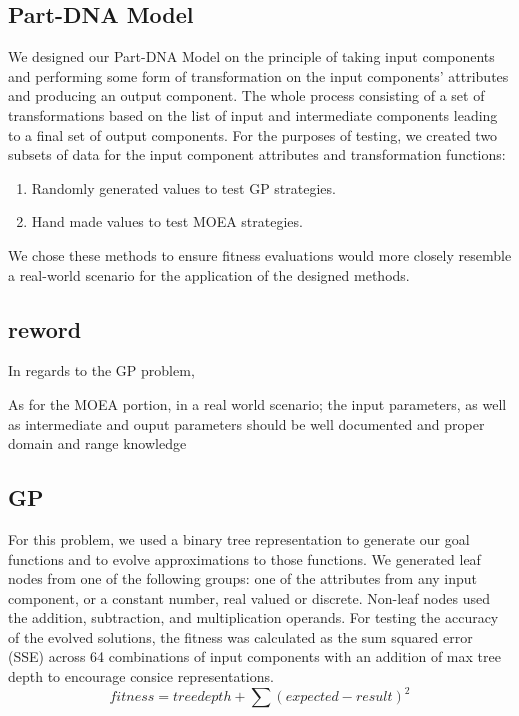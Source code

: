 \documentclass{IEEEtran}
\begin{document}
\subsection{Part-DNA Model}
We designed our Part-DNA Model on the principle of taking input components and performing some form of transformation on the input components' attributes and producing an output component. The whole process consisting of a set of transformations based on the list of input and intermediate components leading to a final set of output components. For the purposes of testing, we created two subsets of data for the input component attributes and transformation functions:
\begin{enumerate}
\item Randomly generated values to test GP strategies.
\item Hand made values to test MOEA strategies.
\end{enumerate}
We chose these methods to ensure fitness evaluations would more closely resemble a real-world scenario for the application of the designed methods.

\subsection{reword}
In regards to the GP problem,

As for the MOEA portion, in a real world scenario; the input parameters, as well as intermediate and ouput parameters should be well documented and proper domain and range knowledge

\subsection{GP}
For this problem, we used a binary tree representation to generate our goal functions and to evolve approximations to those functions. We generated leaf nodes from one of the following groups: one of the attributes from any input component, or a constant number, real valued or discrete. Non-leaf nodes used the addition, subtraction, and multiplication operands. For testing the accuracy of the evolved solutions, the fitness was calculated as the sum squared error (SSE) across 64 combinations of input components with an addition of max tree depth to encourage consice representations.
\begin{equation} \label{eq:1}
fitness=treedepth + \sum (expected-result)^{2}
\end{equation}
\end{document}
